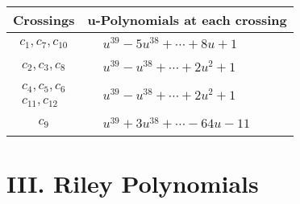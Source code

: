\documentclass[1p]{elsarticle_modified}
\theoremstyle{definition}
\begin{document}
\begin{tabular}{m{50pt}|m{274pt}}
Crossings & \hspace{64pt}u-Polynomials at each crossing \\
\hline $$\begin{aligned}c_{1},c_{7},c_{10}\end{aligned}$$&$\begin{aligned}
&u^{39}-5 u^{38}+\cdots+8 u+1
\end{aligned}$\\
\hline $$\begin{aligned}c_{2},c_{3},c_{8}\end{aligned}$$&$\begin{aligned}
&u^{39}- u^{38}+\cdots+2 u^2+1
\end{aligned}$\\
\hline $$\begin{aligned}c_{4},c_{5},c_{6}\\c_{11},c_{12}\end{aligned}$$&$\begin{aligned}
&u^{39}- u^{38}+\cdots+2 u^2+1
\end{aligned}$\\
\hline $$\begin{aligned}c_{9}\end{aligned}$$&$\begin{aligned}
&u^{39}+3 u^{38}+\cdots-64 u-11
\end{aligned}$\\
\hline
\end{tabular}\newpage\renewcommand{\arraystretch}{1}
\centering \section*{ III. Riley Polynomials}
\end{document}
